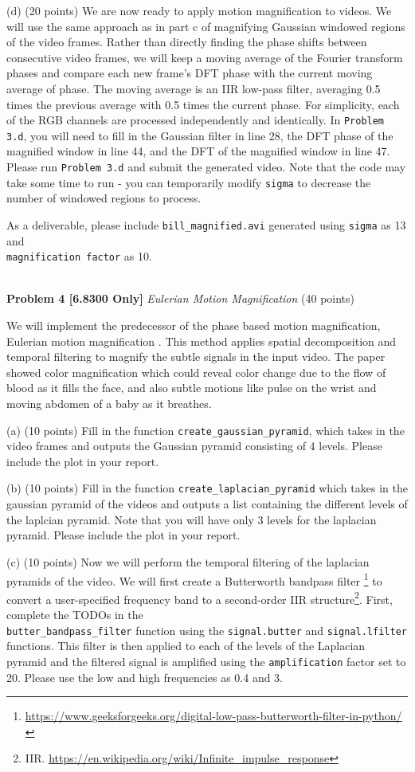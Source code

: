 \documentclass[11pt]{article}
\newcommand{\hwproblem}[2] {\noindent \\ {\bf #1} {\it #2}}
\begin{document}
(d)  (20 points) We are now ready to apply motion magnification to videos. We will use the same approach as in part c of magnifying Gaussian windowed regions of the video frames. Rather than directly finding the phase shifts between consecutive video frames, we will keep a moving average of the Fourier transform phases and compare each new frame's DFT phase with the current moving average of phase. The moving average is an IIR low-pass filter, averaging 0.5 times the previous average with 0.5 times the current phase. For simplicity, each of the RGB channels are processed independently and identically. In \texttt{Problem 3.d}, you will need to fill in the Gaussian filter in line 28, the DFT phase of the magnified window in line 44, and the DFT of the magnified window in line 47. Please run \texttt{Problem 3.d} and submit the generated video. Note that the code may take some time to run - you can temporarily modify \texttt{sigma} to decrease the number of windowed regions to process. 

As a deliverable, please include \texttt{bill\_magnified.avi} generated using \texttt{sigma} as 13 and \\ 
\texttt{magnification factor} as 10. 

\hwproblem{Problem 4 [6.8300 Only]}{Eulerian Motion Magnification} (40 points)

We will implement the predecessor of the phase based motion magnification, Eulerian motion magnification \cite{Wu12Eulerian}. This method applies spatial decomposition and temporal filtering to magnify the subtle signals in the input video. The paper showed color magnification which could reveal color change due to the flow of blood as it fills the face, and also subtle motions like pulse on the wrist and moving abdomen of a baby as it breathes. 

(a) (10 points) Fill in the function \texttt{create\_gaussian\_pyramid}, which takes in the video frames and outputs the Gaussian pyramid consisting of 4 levels. Please include the plot in your report.

(b) (10 points) Fill in the function \texttt{create\_laplacian\_pyramid} which takes in the gaussian pyramid of the videos and outputs a list containing the different levels of the laplcian pyramid. Note that you will have only 3 levels for the laplacian pyramid. Please include the plot in your report.

(c) (10 points) Now we will perform the temporal filtering of the laplacian pyramids of the video. We will first create a Butterworth bandpass filter \footnote{\url{https://www.geeksforgeeks.org/digital-low-pass-butterworth-filter-in-python/}} to convert a user-specified frequency band to a second-order IIR structure\footnote{IIR. \url{https://en.wikipedia.org/wiki/Infinite\_impulse_response}}. First, complete the TODOs in the \\
\texttt{butter\_bandpass\_filter} function using the \texttt{signal.butter} and \texttt{signal.lfilter} functions. This filter is then applied to each of the levels of the Laplacian pyramid and the filtered signal is amplified using the \texttt{amplification} factor set  to 20. Please use the low and high frequencies as 0.4 and 3.
\end{document}
